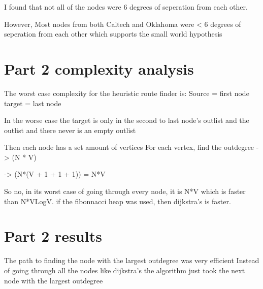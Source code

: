 \documentclass{article}
\begin{document}
I found that not all of the nodes were 6 degrees of seperation from each other.

However, Most nodes from both Caltech and Oklahoma were < 6 degrees of 
seperation from each other which supports the small world hypothesis


\section{Part 2 complexity analysis}
\label{sec:complexity2}

The worst case complexity for the heuristic route finder is:
Source  =  first node
target = last node

In the worse case the target is only in the second to last node's 
outlist and the outlist and there never is an empty outlist

Then each node has a set amount of vertices
For each vertex, find the outdegree -> (N * V)


-> (N*(V + 1 + 1 + 1)) = N*V

So no, in its worst case of going through every node, it is N*V which
is faster than N*VLogV. if the fibonnacci heap was used, then dijkstra's is
faster.


\section{Part 2 results}
\label{sec:part2}

The path to finding the node with the largest outdegree was very efficient
Instead of going through all the nodes like dijkstra's the algorithm just
took the next node with the largest outdegree
\end{document}
